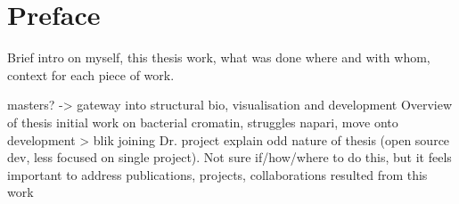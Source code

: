 \chapter{Preface}

Brief intro on myself, this thesis work, what was done where and with whom, context for each piece of work.

\begin{outline}
\1 masters? -> gateway into structural bio, visualisation and development
\1 Overview of thesis
    \2 initial work on bacterial cromatin, struggles
    \2 napari, move onto development > blik
    \2 joining Dr. project
\1 explain odd nature of thesis (open source dev, less focused on single project). Not sure if/how/where to do this, but it feels important to address
\1 publications, projects, collaborations resulted from this work
\end{outline}
